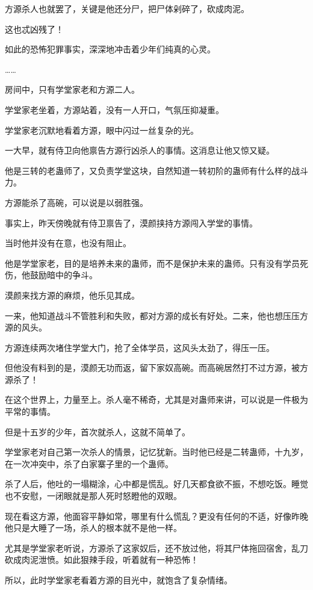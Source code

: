 \begin{this_body}
方源杀人也就罢了，关键是他还分尸，把尸体剁碎了，砍成肉泥。

这也忒凶残了！

如此的恐怖犯罪事实，深深地冲击着少年们纯真的心灵。

……

房间中，只有学堂家老和方源二人。

学堂家老坐着，方源站着，没有一人开口，气氛压抑凝重。

学堂家老沉默地看着方源，眼中闪过一丝复杂的光。

一大早，就有侍卫向他禀告方源行凶杀人的事情。这消息让他又惊又疑。

他是三转的老蛊师了，又负责学堂这块，自然知道一转初阶的蛊师有什么样的战斗力。

方源能杀了高碗，可以说是以弱胜强。

事实上，昨天傍晚就有侍卫禀告了，漠颜挟持方源闯入学堂的事情。

当时他并没有在意，也没有阻止。

他是学堂家老，目的是培养未来的蛊师，而不是保护未来的蛊师。只有没有学员死伤，他鼓励暗中的争斗。

漠颜来找方源的麻烦，他乐见其成。

一来，他知道战斗不管胜利和失败，都对方源的成长有好处。二来，他也想压压方源的风头。

方源连续两次堵住学堂大门，抢了全体学员，这风头太劲了，得压一压。

但他没有料到的是，漠颜无功而返，留下家奴高碗。而高碗居然打不过方源，被方源杀了！

在这个世界上，力量至上。杀人毫不稀奇，尤其是对蛊师来讲，可以说是一件极为平常的事情。

但是十五岁的少年，首次就杀人，这就不简单了。

学堂家老对自己第一次杀人的情景，记忆犹新。当时他已经是二转蛊师，十九岁，在一次冲突中，杀了白家寨子里的一个蛊师。

杀了人后，他吐的一塌糊涂，心中都是慌乱。好几天都食欲不振，不想吃饭。睡觉也不安慰，一闭眼就是那人死时怒瞪他的双眼。

现在看这方源，他面容平静如常，哪里有什么慌乱？更没有任何的不适，好像昨晚他只是大睡了一场，杀人的根本就不是他一样。

尤其是学堂家老听说，方源杀了这家奴后，还不放过他，将其尸体拖回宿舍，乱刀砍成肉泥泄愤。如此狠辣手段，听着就有一种恐怖！

所以，此时学堂家老看着方源的目光中，就饱含了复杂情绪。


\end{this_body}
